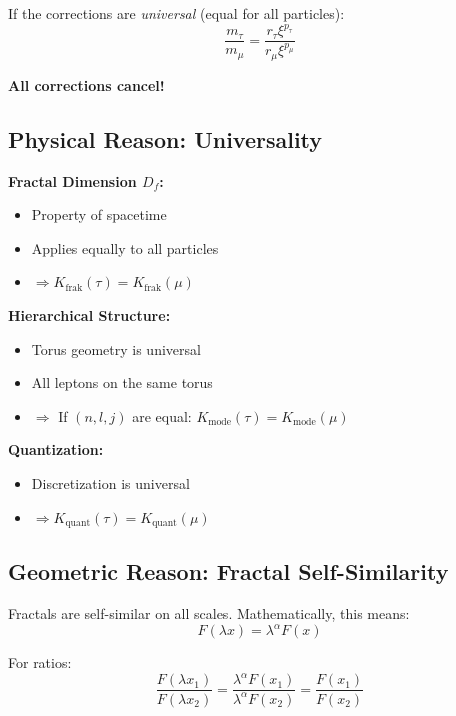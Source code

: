 If the corrections are \textit{universal} (equal for all particles):
\begin{equation}
	\frac{m_\tau}{m_\mu} = \frac{r_\tau \xi^{p_\tau}}{r_\mu \xi^{p_\mu}}
\end{equation}

\textbf{All corrections cancel!}

\subsection{Physical Reason: Universality}

\textbf{Fractal Dimension $D_f$:}
\begin{itemize}[nosep]
	\item Property of spacetime
	\item Applies equally to all particles
	\item $\Rightarrow K_\text{frak}(\tau) = K_\text{frak}(\mu)$
\end{itemize}

\textbf{Hierarchical Structure:}
\begin{itemize}[nosep]
	\item Torus geometry is universal
	\item All leptons on the same torus
	\item $\Rightarrow$ If $(n,l,j)$ are equal: $K_\text{mode}(\tau) = K_\text{mode}(\mu)$
\end{itemize}

\textbf{Quantization:}
\begin{itemize}[nosep]
	\item Discretization is universal
	\item $\Rightarrow K_\text{quant}(\tau) = K_\text{quant}(\mu)$
\end{itemize}

\subsection{Geometric Reason: Fractal Self-Similarity}

Fractals are self-similar on all scales. Mathematically, this means:
\begin{equation}
	F(\lambda x) = \lambda^\alpha F(x)
\end{equation}

For ratios:
\begin{equation}
	\frac{F(\lambda x_1)}{F(\lambda x_2)} = \frac{\lambda^\alpha F(x_1)}{\lambda^\alpha F(x_2)} = \frac{F(x_1)}{F(x_2)}
\end{equation}

